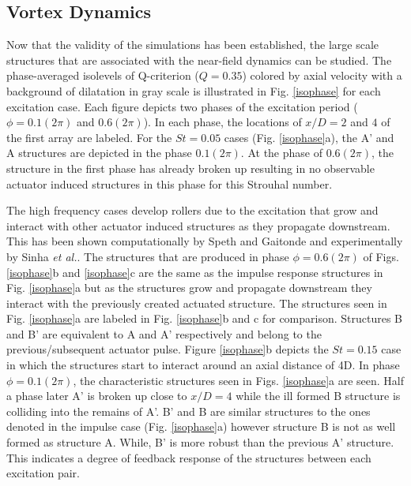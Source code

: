 \documentclass[english]{aiaa-tc}
\begin{document}
\subsection{Vortex Dynamics}
Now that the validity of the simulations has been established, the large scale structures that are associated with the near-field dynamics can be studied. The phase-averaged isolevels of Q-criterion ($Q=0.35$) colored by axial velocity with a background of dilatation in gray scale is illustrated in Fig. \ref{isophase} for each excitation case. Each figure depicts two phases of the excitation period ($\phi =0.1(2\pi)$ and $0.6(2\pi)$). In each phase, the locations of $x/D=2$ and $4$ of the first array are labeled. 
For the $St=0.05$ cases (Fig. \ref{isophase}a), the A' and A structures are depicted in the phase $0.1(2\pi)$. At the phase of $0.6(2\pi)$, the structure in the first phase has already broken up resulting in no observable actuator induced structures in this phase for this Strouhal number. 

The high frequency cases develop rollers due to the excitation that grow and interact with other actuator induced structures as they propagate downstream. This has been shown computationally by Speth and Gaitonde\cite{spethASME2013} and experimentally by Sinha {\em et al.}\cite{sinha2013}. The structures that are produced in phase $\phi=0.6(2\pi)$ of Figs. \ref{isophase}b and \ref{isophase}c are the same as the impulse response structures in Fig. \ref{isophase}a but as the structures grow and propagate downstream they interact with the previously created actuated structure. The structures seen in Fig. \ref{isophase}a are labeled in Fig. \ref{isophase}b and c for comparison. Structures B and B' are equivalent to A and A' respectively and belong to the previous/subsequent actuator pulse. 
Figure \ref{isophase}b depicts the $St=0.15$ case in which the structures start to interact around an axial distance of 4D. In phase $\phi=0.1(2\pi)$, the characteristic structures seen in Figs. \ref{isophase}a are seen. Half a phase later A' is broken up close to $x/D=4$ while the ill formed B structure is colliding into the remains of A'. B' and B are similar structures to the ones denoted in the impulse case (Fig. \ref{isophase}a) however structure B is not as well formed as structure A. While, B' is more robust than the previous A' structure. This indicates a degree of feedback response of the structures between each excitation pair.
\end{document}
